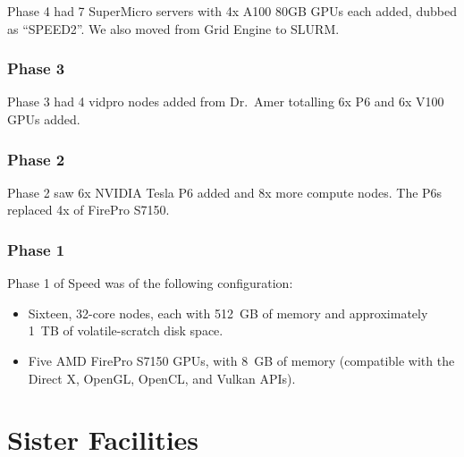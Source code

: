 \documentclass{easychair}
\begin{document}
Phase 4 had 7 SuperMicro servers with 4x A100 80GB GPUs each added,
dubbed as ``SPEED2''. We also moved from Grid Engine to SLURM.

\subsubsection{Phase 3}

Phase 3 had 4 vidpro nodes added from Dr.~Amer totalling 6x P6 and 6x V100
GPUs added.

\subsubsection{Phase 2}

Phase 2 saw 6x NVIDIA Tesla P6 added and 8x more compute nodes.
The P6s replaced 4x of FirePro S7150.

\subsubsection{Phase 1}

Phase 1 of Speed was of the following configuration:

\begin{itemize}
\item
Sixteen, 32-core nodes, each with 512~GB of memory and approximately 1~TB of volatile-scratch disk space. 
\item
Five AMD FirePro S7150 GPUs, with 8~GB of memory (compatible with the Direct X, OpenGL, OpenCL, and Vulkan APIs). 
\end{itemize}



\section{Sister Facilities}
\label{sect:sister-facilities}
\end{document}
